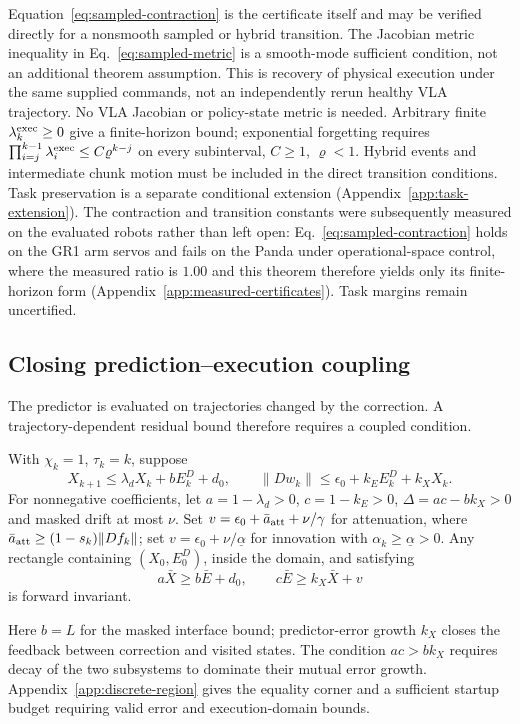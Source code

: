 Equation~\eqref{eq:sampled-contraction} is the certificate itself and may be
verified directly for a nonsmooth sampled or hybrid transition. The Jacobian
metric inequality in Eq.~\eqref{eq:sampled-metric} is a smooth-mode sufficient
condition, not an additional theorem assumption.
This is recovery of physical execution under the same supplied commands,
not an independently rerun healthy VLA trajectory. No VLA Jacobian or
policy-state metric is needed. Arbitrary finite $\lambda_k^{\rm exec}\ge0$
give a finite-horizon bound; exponential
forgetting requires $\prod_{i=j}^{k-1}\lambda_i^{\rm exec}\le C\varrho^{k-j}$ on every
subinterval, $C\ge1$, $\varrho<1$. Hybrid events and intermediate chunk
motion must be included in the direct transition conditions. Task preservation is a separate conditional
extension (Appendix~\ref{app:task-extension}). The contraction and
transition constants were subsequently measured on the evaluated robots
rather than left open: Eq.~\eqref{eq:sampled-contraction} holds on the GR1
arm servos and fails on the Panda under operational-space control, where the
measured ratio is $1.00$ and this theorem therefore yields only its
finite-horizon form (Appendix~\ref{app:measured-certificates}). Task margins
remain uncertified.

\subsection{Closing prediction--execution coupling}
The predictor is evaluated on trajectories changed by the correction.
A trajectory-dependent residual bound therefore requires a coupled condition.
\begin{corollary}
\label{thm:discrete-region}
With $\chi_k=1$, $\tau_k=k$, suppose
\begin{equation}
X_{k+1}\le\lambda_dX_k+bE_k^D+d_0,\qquad
\|Dw_k\|\le\epsilon_0+k_EE_k^D+k_XX_k.
\label{eq:discrete-coupling}
\end{equation}
For nonnegative coefficients, let $a=1-\lambda_d>0$, $c=1-k_E>0$, $\Delta=ac-bk_X>0$ and masked drift
at most $\nu$. Set $v=\epsilon_0+\bar a_{\rm att}+\nu/\gamma$ for attenuation,
where $\bar a_{\rm att}\ge(1-s_k)\|Df_k\|$; set
$v=\epsilon_0+\nu/\underline\alpha$ for innovation with
$\alpha_k\ge\underline\alpha>0$. Any rectangle containing $(X_0,E_0^D)$,
inside the domain, and satisfying
\begin{equation}
a\bar X\ge b\bar E+d_0,\qquad c\bar E\ge k_X\bar X+v
\label{eq:discrete-rectangle}
\end{equation}
is forward invariant.
\end{corollary}
Here $b=L$ for the masked interface bound; predictor-error growth $k_X$ closes
the feedback between correction and visited states. The condition $ac>bk_X$
requires decay of the two subsystems to dominate their mutual error growth.
Appendix~\ref{app:discrete-region} gives the equality corner and a sufficient
startup budget requiring valid error and execution-domain bounds.

